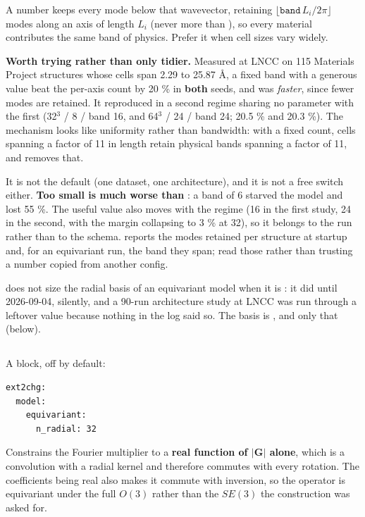 A number keeps every mode below that wavevector, retaining $\lfloor\texttt{band}\,L_i/2\pi\rfloor$ modes along an axis of length $L_i$ (never more than ), so every material contributes the same band of physics. Prefer it when cell sizes vary widely.

\textbf{Worth trying rather than only tidier.} Measured at LNCC on 115 Materials Project structures whose cells span 2.29 to 25.87 \AA{}, a fixed band with a generous value beat the per-axis count by 20 \% in \textbf{both} seeds, and was \emph{faster}, since fewer modes are retained. It reproduced in a second regime sharing no parameter with the first (32$^3$ /  8 / band 16, and 64$^3$ /  24 / band 24; 20.5 \% and 20.3 \%). The mechanism looks like uniformity rather than bandwidth: with a fixed count, cells spanning a factor of 11 in length retain physical bands spanning a factor of 11, and  removes that.

It is not the default (one dataset, one architecture), and it is not a free switch either. \textbf{Too small is much worse than }: a band of 6 starved the model and lost 55 \%. The useful value also moves with the regime (16 in the first study, 24 in the second, with the margin collapsing to 3 \% at 32), so it belongs to the run rather than to the schema.  reports the modes retained per structure at startup and, for an equivariant run, the band they span; read those rather than trusting a number copied from another config.

 does not size the radial basis of an equivariant model when it is : it did until 2026-09-04, silently, and a 90-run architecture study at LNCC was run through a leftover value because nothing in the log said so. The basis is , and only that (below).

\subsection{}

A block, off by default:

\begin{lstlisting}
ext2chg:
  model:
    equivariant:
      n_radial: 32
\end{lstlisting}

Constrains the Fourier multiplier to a \textbf{real function of $|\mathbf{G}|$ alone}, which is a convolution with a radial kernel and therefore commutes with every rotation. The coefficients being real also makes it commute with inversion, so the operator is equivariant under the full $O(3)$ rather than the $SE(3)$ the construction was asked for.


